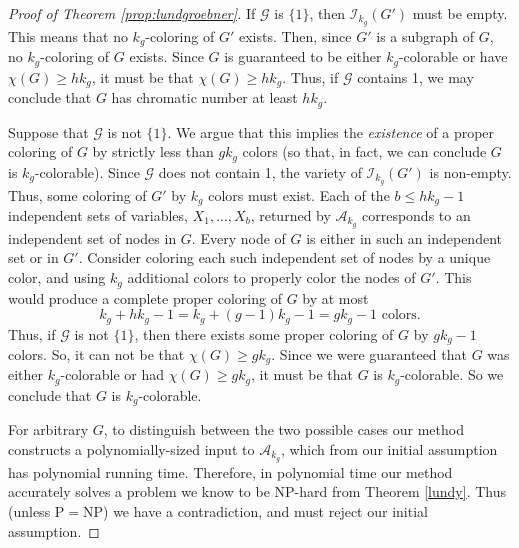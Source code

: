 \documentclass{article}
\newcommand{\A}[0]{\mathcal{A}}
\begin{document}
\begin{proof}[Proof of Theorem \ref{prop:lundgroebner}]
If $\mathcal{G}$ is $\{1\}$, then $\mathcal{I}_{k_g}(G')$ must be empty. This means that no $k_g$\nobreakdash-coloring of $G'$ exists. Then, since $G'$ is a subgraph of $G$, no $k_g$-coloring of $G$ exists. Since $G$ is guaranteed to be either $k_g$\nobreakdash-colorable or have $\chi(G)\geq hk_g$, it must be that $\chi(G)\geq hk_g$. Thus, if $\mathcal{G}$ contains 1, we may conclude that $G$ has chromatic number at least $hk_g$.

Suppose that $\mathcal{G}$ is not $\{1\}$. We argue that this implies the \emph{existence} of a proper coloring of $G$ by strictly less than $gk_g$ colors (so that, in fact, we can conclude $G$ is $k_g$\nobreakdash-colorable). Since $\mathcal{G}$ does not contain 1, the variety of  $\mathcal{I}_{k_g}(G')$ is non-empty. Thus, some coloring of $G'$ by $k_g$ colors must exist. Each of the $b\leq hk_g-1$ independent sets of variables, $X_1,...,X_b$, returned by $\A_{k_g}$ corresponds to an independent set of nodes in $G$. Every node of $G$ is either in such an independent set or in $G'$. Consider coloring each such independent set of nodes by a unique color, and using $k_g$ additional colors to properly color the nodes of $G'$. This would produce a complete proper coloring of $G$ by 
at most
\[
k_g+ hk_g-1= k_g+ (g-1)k_g-1=gk_g-1 \text{ colors.}
\]
Thus, if $\mathcal{G}$ is not $\{1\}$, then there exists some proper coloring of $G$ by $gk_g-1$ colors.
So, it can not be that $\chi(G)\geq gk_g$. Since we were guaranteed that $G$ was either $k_g$\nobreakdash-colorable or had $\chi(G)\geq gk_g$, it must be that $G$ is $k_g$\nobreakdash-colorable. So we conclude that $G$ is $k_g$\nobreakdash-colorable.

For arbitrary $G$, to distinguish between the two possible cases our method constructs a polynomially-sized input to $\A_{k_g}$, which from our initial assumption has polynomial running time. Therefore, in polynomial time our method accurately solves a problem we know to be NP-hard from Theorem \ref{lundy}. Thus (unless P$=$NP) we have a contradiction, and must reject our initial assumption. 
\end{proof}
\end{document}
